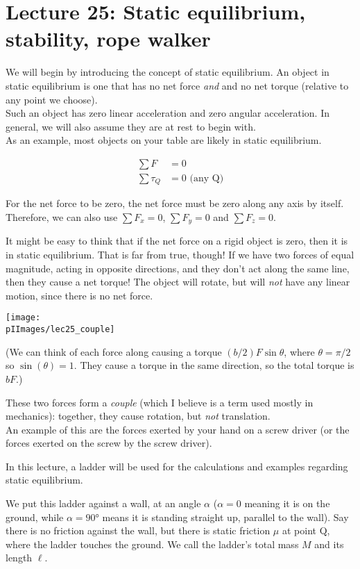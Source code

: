 
\section{Lecture 25: Static equilibrium, stability, rope walker}

We will begin by introducing the concept of static equilibrium. An object in static equilibrium is one that has no net force \emph{and} and no net torque (relative to any point we choose).\\
Such an object has zero linear acceleration and zero angular acceleration. In general, we will also assume they are at rest to begin with.\\
As an example, most objects on your table are likely in static equilibrium.

\begin{align}
\sum F &= 0\\
\sum \tau_Q &= 0 \text{ (any Q)}
\end{align}

For the net force to be zero, the net force must be zero along any axis by itself. Therefore, we can also use $\sum F_x = 0$, $\sum F_y = 0$ and $\sum F_z = 0$.

It might be easy to think that if the net force on a rigid object is zero, then it is in static equilibrium. That is far from true, though! If we have two forces of equal magnitude, acting in opposite directions, and they don't act along the same line, then they cause a net torque! The object will rotate, but will \emph{not} have any linear motion, since there is no net force.

\begin{center}
\texttt{[image: \\pIImages/lec25\_couple]}
\end{center}

(We can think of each force along causing a torque $(b/2) F \sin \theta$, where $\theta = \pi/2$ so $\sin(\theta) = 1$. They cause a torque in the same direction, so the total torque is $b F$.)

These two forces form a \emph{couple} (which I believe is a term used mostly in mechanics): together, they cause rotation, but \emph{not} translation.\\
An example of this are the forces exerted by your hand on a screw driver (or the forces exerted on the screw by the screw driver).

In this lecture, a ladder will be used for the calculations and examples regarding static equilibrium.

We put this ladder against a wall, at an angle $\alpha$ ($\alpha = 0$ meaning it is on the ground, while $\alpha = \ang{90}$ means it is standing straight up, parallel to the wall). Say there is no friction against the wall, but there is static friction $\mu$ at point Q, where the ladder touches the ground. We call the ladder's total mass $M$ and its length $\ell$.

